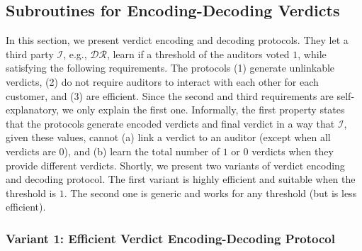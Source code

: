 
\subsection{Subroutines for  Encoding-Decoding Verdicts}\label{sec::Encoding-Decoding-Verdicts}


In this section, we present verdict encoding and decoding protocols. They let a third party $\mathcal{I}$, e.g., $\mathcal{DR}$, learn if a threshold of the auditors voted $1$, while satisfying the following requirements.  The protocols  (1) generate unlinkable verdicts, (2) do not require auditors to interact with each other for each customer, and (3) are efficient. Since the second and third requirements are self-explanatory,  we only explain the first one.  Informally, the first property states that the protocols generate encoded verdicts and final verdict in a way that $\mathcal{I}$,  given these values, cannot (a)   link a  verdict to an auditor (except when all verdicts are $0$), and (b) learn the total number of $1$ or $0$ verdicts when they provide different verdicts.  Shortly, we present two variants of verdict encoding and decoding protocol. The first variant is highly efficient and suitable when the threshold is $1$. The second one is generic and works for any threshold (but is less efficient). 


\subsubsection{Variant 1:  Efficient Verdict  Encoding-Decoding Protocol}



